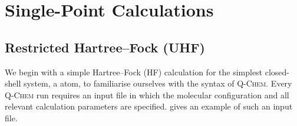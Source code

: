 \renewcommand*{\codelocation}{codesnippets/singlepoint}

\section{Single-Point Calculations}

		\subsection{Restricted Hartree--Fock (UHF)}
	
		We begin with a simple Hartree--Fock (HF) calculation for the simplest closed-shell system, a  atom, to familiarise ourselves with the syntax of \textsc{Q-Chem}.
		Every \textsc{Q-Chem} run requires an input file in which the molecular configuration and all relevant calculation parameters are specified.
		 gives an example of such an input file.
			
		
